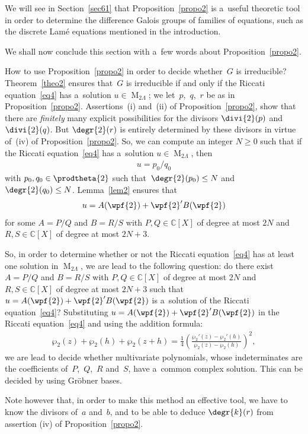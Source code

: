 \documentclass[pdftex]{sigma}
\numberwithin{equation}{section}
\begin{document}
We will see in Section~\ref{sec61} that Proposition~\ref{propo2} is a~useful theoretic tool in order to determine the
dif\/ference Galois groups of families of equations, such as the discrete Lam\'e equations mentioned in the introduction.

We shall now conclude this section with a~few words about Proposition~\ref{propo2}.

\begin{Remark}
How to use Proposition~\ref{propo2} in order to decide whether~$G$ is irreducible? Theo\-rem~\ref{theo2} ensures that~$G$
is irreducible if and only if the Riccati equation~\eqref{eq4} has a~solution $u \in \operatorname{M}_{2 \Lambda}$; we
let~$p$,~$q$,~$r$ be as in Proposition~\ref{propo2}.
Assertions~(i) and~(ii) of Proposition~\ref{propo2}, show that there are \textit{finitely} many explicit possibilities
for the divisors $\divi{2} (p)$ and~$\divi{2}(q)$.
But $\degr{2} (r)$ is entirely determined by these divisors in virtue of~(iv) of Proposition~\ref{propo2}.
So, we can compute an integer $N \geq 0$ such that if the Riccati equation~\eqref{eq4} has a~solution $u \in
\operatorname{M}_{2 \Lambda}$, then
\begin{gather*}
u=p_{0}/q_{0}
\end{gather*}
with $p_{0},q_{0} \in \prodtheta{2}$ such that~${\degr{2} (p_{0}) \leq N}$ and ${\degr{2} (q_{0}) \leq N}$.
Lemma~\ref{lem2} ensures that
\begin{gather*}
u=A(\wpf{2})+\wpf{2}' B(\wpf{2})
\end{gather*}
for some $A=P/Q$ and $B=R/S$ with $P,Q \in \mathbb C[X]$ of degree at most $2N$ and $R,S \in \mathbb C[X]$ of degree at
most $2N+3$.

So, in order to determine whether or not the Riccati equation~\eqref{eq4} has at least one solution in
$\operatorname{M}_{2\Lambda}$, we are lead to the following question: do there exist $A=P/Q$ and $B=R/S$ with $P,Q \in
\mathbb C[X]$ of degree at most $2N$ and ${R,S \in \mathbb C[X]}$ of degree at most $2N+3$ such that $
u=A(\wpf{2})+\wpf{2}' B(\wpf{2}) $ is a~solution of the Riccati equation~\eqref{eq4}? Substituting
$u=A(\wpf{2})+\wpf{2}' B(\wpf{2})$ in the Riccati equation~\eqref{eq4} and using the addition formula:
\begin{gather*}
\wp_{2}(z)+\wp_{2}(h)+\wp_{2}(z+h)=\frac{1}{4} \left(\frac{\wp_{2}'(z)-\wp_{2}'(h)}{\wp_{2}(z)-\wp_{2}(h)}\right)^{2},
\end{gather*}
we are lead to decide whether multivariate polynomials, whose indeterminates are the coef\/f\/icients of~$P$,~$Q$,~$R$ and~$S$,
have a~common complex solution.
This can be decided by using Gr\"obner bases.

Note however that, in order to make this method an ef\/fective tool, we have to know the divisors of~$a$ and~$b$, and to
be able to deduce $\degr{k}(r)$ from assertion (iv) of Proposition~\ref{propo2}.
\end{Remark}
\end{document}
